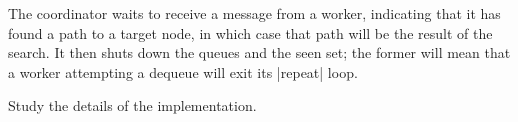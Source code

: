 The coordinator waits to receive a message from a worker, indicating that it
has found a path to a target node, in which case that path will be the result
of the search.  It then shuts down the queues and the seen set; the former
will mean that a worker attempting a dequeue will exit its |repeat| loop. 

\begin{instruction}
Study the details of the implementation.
\end{instruction}
